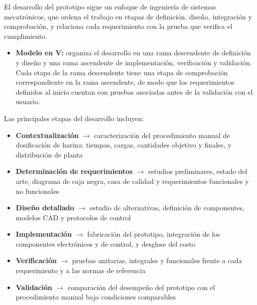 El desarrollo del prototipo sigue un enfoque de ingeniería de sistemas
mecatrónicos, que ordena el trabajo en etapas de definición, diseño,
integración y comprobación, y relaciona cada requerimiento con la prueba que
verifica el cumplimiento.

\begin{itemize}
    \item \textbf{Modelo en V:} organiza el desarrollo en una rama
    descendente de definición y diseño y una rama ascendente de
    implementación, verificación y validación. Cada etapa de la rama
    descendente tiene una etapa de comprobación correspondiente en la rama
    ascendente, de modo que los requerimientos definidos al inicio cuentan
    con pruebas asociadas antes de la validación con el usuario.
\end{itemize}

Las principales etapas del desarrollo incluyen:

\begin{itemize}
    \item \textbf{Contextualización} $\rightarrow$ caracterización del
    procedimiento manual de dosificación de harina: tiempos, cargas,
    cantidades objetivo y finales, y distribución de planta 

    \item \textbf{Determinación de requerimientos} $\rightarrow$ estudios
    preliminares, estado del arte, diagrama de caja negra, casa de calidad y
    requerimientos funcionales y no funcionales 

    \item \textbf{Diseño detallado} $\rightarrow$ estudio de alternativas,
    definición de componentes, modelos CAD y protocolos de control 

    \item \textbf{Implementación} $\rightarrow$ fabricación del prototipo,
    integración de los componentes electrónicos y de control, y desglose del
    costo 

    \item \textbf{Verificación} $\rightarrow$ pruebas unitarias, integrales y
    funcionales frente a cada requerimiento y a las normas de referencia
  

    \item \textbf{Validación} $\rightarrow$ comparación del desempeño del
    prototipo con el procedimiento manual bajo condiciones comparables
   
\end{itemize}


\clearpage
\flushbottom